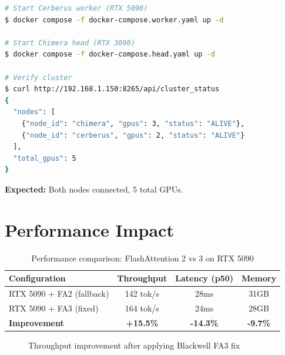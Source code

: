 \documentclass[10pt,letterpaper]{article}
\begin{document}
\begin{lstlisting}[language=bash]
# Start Cerberus worker (RTX 5090)
$ docker compose -f docker-compose.worker.yaml up -d

# Start Chimera head (RTX 3090)
$ docker compose -f docker-compose.head.yaml up -d

# Verify cluster
$ curl http://192.168.1.150:8265/api/cluster_status
{
  "nodes": [
    {"node_id": "chimera", "gpus": 3, "status": "ALIVE"},
    {"node_id": "cerberus", "gpus": 2, "status": "ALIVE"}
  ],
  "total_gpus": 5
}
\end{lstlisting}

\textbf{Expected:} Both nodes connected, 5 total GPUs.

\section{Performance Impact}

\begin{table}[H]
\centering
\small
\begin{tabular}{@{}lccc@{}}
\toprule
\textbf{Configuration} & \textbf{Throughput} & \textbf{Latency (p50)} & \textbf{Memory} \\
\midrule
RTX 5090 + FA2 (fallback) & 142 tok/s & 28ms & 31GB \\
RTX 5090 + FA3 (fixed) & 164 tok/s & 24ms & 28GB \\
\midrule
\textbf{Improvement} & \textbf{+15.5\%} & \textbf{-14.3\%} & \textbf{-9.7\%} \\
\bottomrule
\end{tabular}
\caption{Performance comparison: FlashAttention 2 vs 3 on RTX 5090}
\end{table}

\begin{figure}[H]
\centering
{}
\caption{Throughput improvement after applying Blackwell FA3 fix}
\end{figure}
\end{document}
